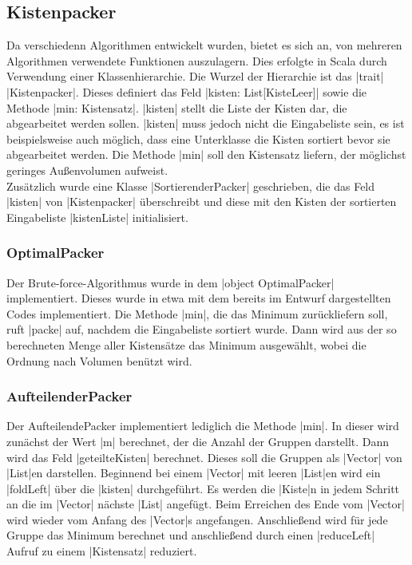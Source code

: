 \subsection{Kistenpacker}
Da verschiedenn Algorithmen entwickelt wurden, bietet es sich an, von mehreren Algorithmen verwendete Funktionen auszulagern.
Dies erfolgte in Scala durch Verwendung einer Klassenhierarchie.
Die Wurzel der Hierarchie ist das |trait| |Kistenpacker|. Dieses definiert das Feld |kisten: List[KisteLeer]| sowie die Methode |min: Kistensatz|.
|kisten| stellt die Liste der Kisten dar, die abgearbeitet werden sollen.
|kisten| muss jedoch nicht die Eingabeliste sein, es ist beispielsweise auch möglich, dass eine Unterklasse die Kisten sortiert bevor sie abgearbeitet werden.
Die Methode |min| soll den Kistensatz liefern, der möglichst geringes Außenvolumen aufweist.\\
Zusätzlich wurde eine Klasse |SortierenderPacker| geschrieben,
  die das Feld |kisten| von |Kistenpacker| überschreibt und diese mit den Kisten der sortierten Eingabeliste |kistenListe| initialisiert.
\subsubsection{OptimalPacker}
Der Brute-force-Algorithmus wurde in dem |object OptimalPacker| implementiert.
Dieses wurde in etwa mit dem bereits im Entwurf dargestellten Codes implementiert.
Die Methode |min|, die das Minimum zurückliefern soll, ruft |packe| auf, nachdem die Eingabeliste sortiert wurde.
Dann wird aus der so berechneten Menge aller Kistensätze das Minimum ausgewählt, wobei die Ordnung nach Volumen benützt wird.
\subsubsection{AufteilenderPacker}
Der AufteilendePacker implementiert lediglich die Methode |min|.
In dieser wird zunächst der Wert |m| berechnet, der die Anzahl der Gruppen darstellt.
Dann wird das Feld |geteilteKisten| berechnet. Dieses soll die Gruppen als |Vector| von |List|en darstellen.
Beginnend bei einem |Vector| mit leeren |List|en wird ein |foldLeft| über die |kisten| durchgeführt.
Es werden die |Kiste|n in jedem Schritt an die im |Vector| nächste |List| angefügt.
Beim Erreichen des Ende vom |Vector| wird wieder vom Anfang des |Vector|s angefangen.
Anschließend wird für jede Gruppe das Minimum berechnet und anschließend durch einen |reduceLeft| Aufruf zu einem |Kistensatz| reduziert.
